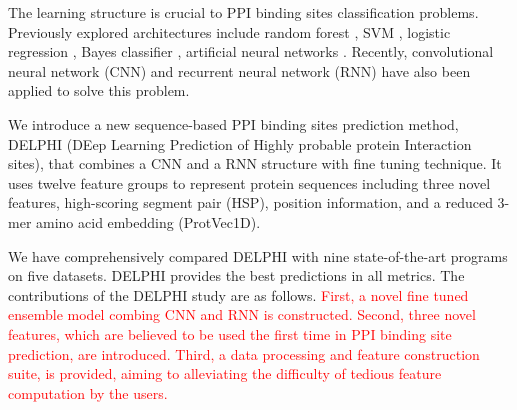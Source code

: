 \documentclass{bioinfo}
\newcommand{\myColor}{red}
\begin{document}
The learning structure is crucial to PPI binding sites classification problems. Previously explored architectures include random forest \citep{wei2016protein, wang2019protein}, SVM \citep{wei2016protein}, logistic regression \citep{zhang2019scriber}, Bayes classifier \citep{murakami2010applying}, artificial neural networks \citep{singh2014springs}. Recently, convolutional neural network (CNN) \citep{zeng2019protein} and recurrent neural network (RNN) \citep{zhang2019sequence} have also been applied to solve this problem. 

We introduce a new sequence-based PPI binding sites prediction method, DELPHI (DEep Learning Prediction of Highly probable protein Interaction sites), that combines a CNN and a RNN structure with fine tuning technique. It uses twelve feature groups to represent protein sequences including three novel features, high-scoring segment pair (HSP), position information, and a reduced 3-mer amino acid embedding (ProtVec1D).

We have comprehensively compared DELPHI with nine state-of-the-art programs on five datasets. DELPHI provides the best predictions in all metrics. The contributions of the DELPHI study are as follows. \textcolor{\myColor}{
First, a novel fine tuned ensemble model combing CNN and RNN is constructed. Second, three novel features, which are believed to be used the first time in PPI binding site prediction, are introduced. Third, a data processing and feature construction suite, is provided, aiming to alleviating the difficulty of tedious feature computation by the users.}
\end{document}
